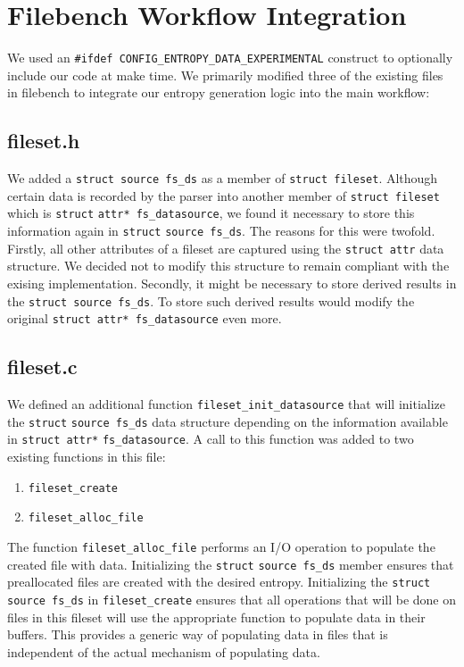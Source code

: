 \section{Filebench Workflow Integration}
We used an \verb+#ifdef CONFIG_ENTROPY_DATA_EXPERIMENTAL+ construct to optionally include our code at make time. We primarily modified three of the existing files in filebench to integrate our entropy generation logic into the main workflow:
\subsection{fileset.h}
We added a \verb+struct source fs_ds+ as a member of \verb+struct fileset+. Although certain data is recorded by the parser into another member of \verb+struct fileset+ which is \verb+struct+ \verb+attr* fs_datasource+, we found it necessary to store this information again in \verb+struct+ \verb+source fs_ds+. The reasons for this were twofold. Firstly, all other attributes of a fileset are captured using the \verb+struct attr+ data structure. We decided not to modify this structure to remain compliant with the exising implementation. Secondly, it might be necessary to store derived results in the \verb+struct source fs_ds+. To store such derived results would modify the original \verb+struct attr* fs_datasource+ even more.

\subsection{fileset.c}
We defined an additional function \verb+fileset_init_datasource+ that will initialize the \verb+struct+ \verb+source fs_ds+ data structure depending on the information available in \verb+struct attr*+ \verb+fs_datasource+. A call to this function was added to two existing functions in this file:
\begin{enumerate}
\item \verb+fileset_create+
\item \verb+fileset_alloc_file+
\end{enumerate}

The function \verb+fileset_alloc_file+ performs an I/O operation to populate the created file with data. Initializing the \verb+struct+ \verb+source fs_ds+ member ensures that preallocated files are created with the desired entropy. Initializing the \verb+struct source fs_ds+ in \newline\verb+fileset_create+ ensures that all operations that will be done on files in this fileset will use the appropriate function to populate data in their buffers. This provides a generic way of populating data in files that is independent of the actual mechanism of populating data.

